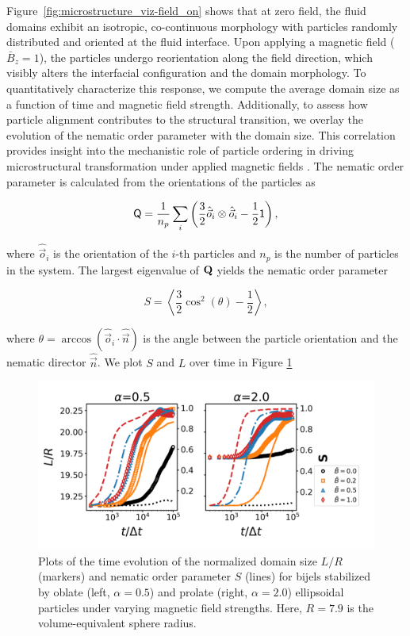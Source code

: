 Figure~\ref{fig:microstructure_viz-field_on} shows that at zero field, the fluid domains exhibit an isotropic, co-continuous morphology with particles randomly 
distributed and oriented at the fluid interface. Upon applying a magnetic field (\(\bar{B}_z = 1\)), the particles undergo reorientation along the field direction, 
which visibly alters the interfacial configuration and the domain morphology. 
To quantitatively characterize this response, we compute the average domain size as a function of time and magnetic field strength. Additionally, to assess 
how particle alignment contributes to the structural transition, we overlay the evolution of the nematic order parameter with the domain size. This correlation 
provides insight into the mechanistic role of particle ordering in driving microstructural transformation under applied magnetic fields \cite{veerman_phase_1992}.
The nematic order parameter is calculated from the orientations of the particles as    

\begin{equation}
\tens{Q} = \frac{1}{n_p} \sum_i \left( \frac{3}{2} \hat{\vec{o}}_i \otimes \hat{\vec{o}}_i -\frac{1}{2}\mathsf{1} \right) ,
\end{equation}

where \(\hat{\vec{o}}_i\) is the orientation of the \(i\)-th particles and \(n_p\) is the number of particles in the system. The largest eigenvalue of 
\(\tens{Q}\) yields the nematic order parameter

\begin{equation}
S = \left\langle \frac{3}{2}\cos^2 (\theta) - \frac{1}{2} \right\rangle ,
\end{equation}

where \(\theta=\arccos(\hat{\vec{o}}_i\cdot\hat{\vec{n}})\) is the angle between the particle orientation and the nematic director \(\hat{\vec{n}}\). We plot $S$
and $L$ over time in Figure \ref{fig:domain_size-field_on}

\begin{figure} 
\centering 
\includegraphics[scale=0.5]{../figures/results/paper2/domain_size-field_on.png} 
\caption{Plots of the time evolution of the normalized domain size \(L/R\) (markers) and nematic order parameter 
         \(S\) (lines) for bijels stabilized by oblate (left, \(\alpha = 0.5\)) and prolate (right, \(\alpha = 2.0\)) ellipsoidal particles under varying 
         magnetic field strengths. Here, \(R = 7.9\) is the volume-equivalent sphere radius.} 
\label{fig:domain_size-field_on} 
\end{figure}

